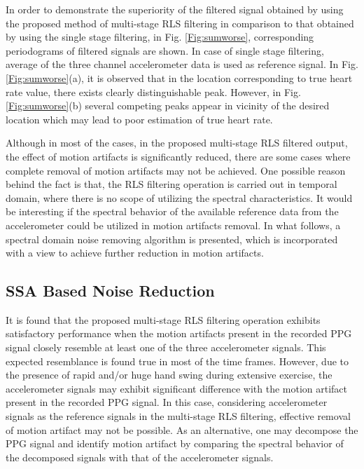 \documentclass[final,3p,times,authoryear]{elsarticle}
\begin{document}
In order to demonstrate the superiority of the filtered signal obtained by using the proposed method of multi-stage RLS filtering in comparison to that obtained by using the single stage filtering, in Fig. \ref{Fig:sumworse}, corresponding periodograms of filtered signals are shown. In case of single stage filtering, average of the three channel accelerometer data is used as reference signal. In Fig. \ref{Fig:sumworse}(a), it is observed that in the location corresponding to true heart rate value, there exists clearly distinguishable peak. However, in Fig. \ref{Fig:sumworse}(b) several competing peaks appear in vicinity of the desired location which may lead to poor estimation of true heart rate. 

Although in most of the cases, in the proposed multi-stage RLS filtered output, the effect of motion artifacts is significantly reduced, there are some cases where complete removal of motion artifacts may not be achieved. One possible reason behind the fact is that, the RLS filtering operation is carried out in temporal domain, where there is no scope of utilizing the spectral characteristics. It would be interesting if the spectral behavior of the available reference data from the accelerometer could be utilized in motion artifacts removal. In what follows, a spectral domain noise removing algorithm is presented, which is incorporated with a view to achieve further reduction in motion artifacts. 


\subsection{SSA Based Noise Reduction}

It is found that the proposed multi-stage RLS filtering operation exhibits satisfactory performance when the motion artifacts present in the recorded PPG signal closely resemble at least one of the three accelerometer signals. This expected resemblance is found true in most of the time frames. However, due to the presence of rapid and/or huge hand swing during extensive exercise, the accelerometer signals may exhibit significant difference with the motion artifact present in the recorded PPG signal. In this case, considering accelerometer signals as the reference signals in the multi-stage RLS filtering, effective removal of motion artifact may not be possible. As an alternative, one may  decompose the PPG signal and identify motion artifact by comparing the spectral behavior of the decomposed signals with that of the accelerometer signals. %
\end{document}
